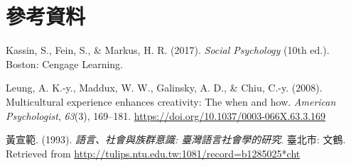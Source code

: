 \documentclass[oneside]{book}
\let\oldhref=\href
\renewcommand{\href}[2]{#2\footnote{\url{#1}}}
\theoremstyle{definition}
\theoremstyle{definition}
\theoremstyle{definition}
\theoremstyle{remark}
\begin{document}
\renewcommand{\href}{\oldhref}

\hypertarget{references}{%
\chapter*{參考資料}\label{references}}

\hypertarget{refs}{}
\leavevmode\hypertarget{ref-kassin2017}{}%
Kassin, S., Fein, S., \& Markus, H. R. (2017). \emph{Social Psychology} (10th ed.). Boston: Cengage Learning.

\leavevmode\hypertarget{ref-leung2008}{}%
Leung, A. K.-y., Maddux, W. W., Galinsky, A. D., \& Chiu, C.-y. (2008). Multicultural experience enhances creativity: The when and how. \emph{American Psychologist}, \emph{63}(3), 169--181. \url{https://doi.org/10.1037/0003-066X.63.3.169}

\leavevmode\hypertarget{ref-huangxuanfan1993}{}%
黃宣範. (1993). \emph{語言、社會與族群意識: 臺灣語言社會學的研究}. 臺北市: 文鶴. Retrieved from \url{http://tulips.ntu.edu.tw:1081/record=b1285025*cht}
\end{document}

